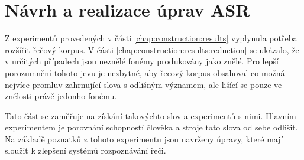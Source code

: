 \chapter{Návrh a realizace úprav ASR}
\label{chap:realisation}

Z experimentů provedených v části \ref{chap:construction:results} vyplynula
potřeba rozšířit řečový korpus. V části \ref{chap:construction:results:reduction} se ukázalo, že v určitých případech jsou neznělé fonémy produkovány jako znělé. Pro lepší porozumnění tohoto jevu je nezbytné, aby řecový korpus obsahoval co možná nejvíce promluv zahrnující slova s odlišným významem, ale lišící se pouze ve znělosti právě jedonho fonému.

Tato část se zaměřuje na získání takovýchto slov a experimentů s nimi. Hlavním experimentem je porovnání schopností člověka a stroje tato slova od sebe odlišit. Na základě poznatků z tohoto experimentu jsou navrženy úpravy, které mají sloužit k zlepšení systémů rozpoznávání řeči.








